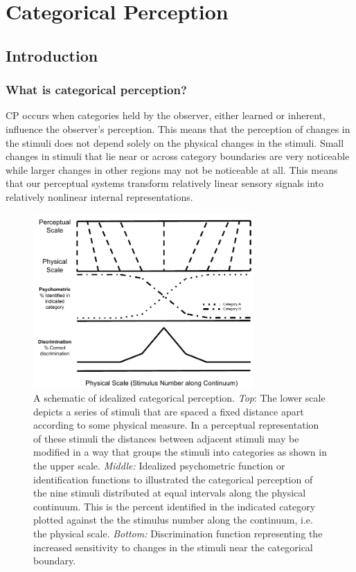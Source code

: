 \chapter{Categorical Perception}

\section{Introduction}
\subsection{What is categorical perception?}

\acf{CP} occurs when categories held by the observer, either learned or inherent, influence the observer’s perception. This means that the perception of changes in the stimuli does not depend solely on the physical changes in the stimuli. Small changes in stimuli that lie near or across category boundaries are very noticeable while larger changes in other regions may not be noticeable at all. This means that our perceptual systems transform relatively linear sensory signals into relatively nonlinear internal representations.

\begin{figure}[h] 
  \centering
  \includegraphics[width=0.75\textwidth]{figures/CP_def.pdf}
  \caption[A schematic of idealized categorical perception]
{A schematic of idealized categorical perception. \emph{Top}: The lower scale depicts a series of stimuli that are spaced a fixed distance apart according to some physical measure. In a perceptual representation of these stimuli the distances between adjacent stimuli may be modified in a way that groups the stimuli into categories as shown in the upper scale. \emph{Middle:} Idealized psychometric function or identification functions to illustrated the categorical perception of the nine stimuli distributed at equal intervals along the physical continuum. This is the percent identified in the indicated category plotted against the the stimulus number along the continuum, i.e. the physical scale. \emph{Bottom:} Discrimination function representing the increased sensitivity to changes in the stimuli near the categorical boundary.}
  \label{fig:cpdef}
\end{figure}

